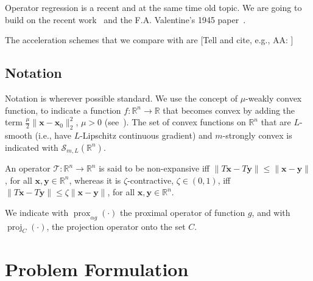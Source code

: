 \documentclass{article}
\DeclareMathOperator{\prox}{prox}
\DeclareMathOperator{\proj}{proj}
\newcommand{\R}{\mathbb{R}}
\newcommand{\x}{\mathbold{x}}
\newcommand{\y}{\mathbold{y}}
\newcommand{\T}{\mathcal{T}}
\newcommand{\andrea}[1]{{\color{red}[#1]}}
\begin{document}
Operator regression is a recent and at the same time old topic. We are going to build on the recent work~\cite{ryu_operator_2020} and the F.A. Valentine's 1945 paper~\cite{valentine_lipschitz_1945}.

The acceleration schemes that we compare with are \andrea{Tell and cite, e.g., AA: \cite{pmlr-v119-mai20a}}

\subsection{Notation}

Notation is wherever possible standard. We use the concept of $\mu$-weakly convex function, to indicate a function $f:\R^n \to \R$ that becomes convex by adding the term $\frac{\mu}{2} \|\x-\x_0\|^2_2$, $\mu >0$ (see~\cite{Duchi2018,Davis2019,pmlr-v119-mai20b}). The set of convex functions on $\R^n$ that are $L$-smooth (i.e., have $L$-Lipschitz continuous gradient) and $m$-strongly convex is indicated with $\mathcal{S}_{m,L}(\R^n)$.

An operator $\T: \R^n \to \R^n$ is said to be non-expansive iff $\|T \x - T \y \| \leq \|\x- \y\|$, for all $\x, \y \in \R^n$, whereas it is $\zeta$-contractive, $\zeta\in(0,1)$, iff $\|T \x - T \y \| \leq \zeta \|\x- \y\|$, for all $\x, \y \in \R^n$.

We indicate with $\prox_{\alpha g}(\cdot)$ the proximal operator of function $g$, and with $\proj_{C}(\cdot)$, the projection operator onto the set $C$. 


\section{Problem Formulation}
\end{document}
